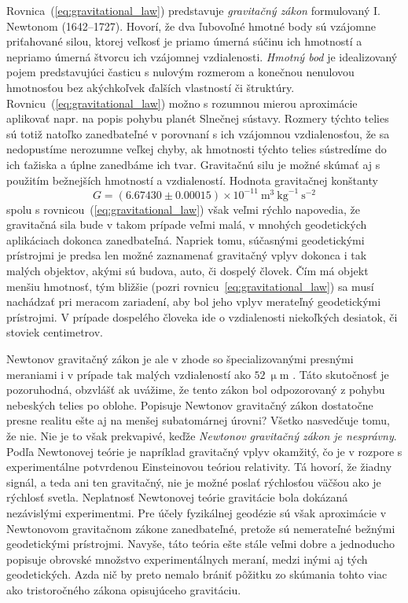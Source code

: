 \documentclass[a4paper, 12pt]{book}
\begin{document}
Rovnica~(\ref{eq:gravitational_law}) predstavuje \emph{gravitačný zákon} formulovaný 
I. Newtonom (1642--1727).  Hovorí, že dva ľubovoľné hmotné body sú vzájomne 
priťahované silou, ktorej veľkosť je priamo úmerná súčinu ich hmotností 
a nepriamo úmerná štvorcu ich vzájomnej vzdialenosti.  \emph{Hmotný bod} je 
idealizovaný pojem predstavujúci časticu s nulovým rozmerom a konečnou 
nenulovou hmotnosťou bez akýchkoľvek ďalších vlastností či štruktúry.  
Rovnicu~(\ref{eq:gravitational_law}) možno s rozumnou mierou aproximácie aplikovať 
napr. na popis pohybu planét Slnečnej sústavy.  Rozmery týchto telies sú totiž 
natoľko zanedbateľné v porovnaní s ich vzájomnou vzdialenosťou, že sa 
nedopustíme nerozumne veľkej chyby, ak hmotnosti týchto telies sústredíme do 
ich ťažiska a úplne zanedbáme ich tvar.  Gravitačnú silu je možné skúmať aj 
s použitím bežnejších hmotností a vzdialeností.  Hodnota gravitačnej konštanty
%
\begin{equation}
G = (6.67430 \pm 0.00015) \times 10^{-11} \ \mathrm{m}^3 \ \mathrm{kg}^{-1} 
\ \mathrm{s}^{-2}
\end{equation}
%
spolu s rovnicou~(\ref{eq:gravitational_law}) však veľmi rýchlo napovedia, že 
gravitačná sila bude v takom prípade veľmi malá, v mnohých geodetických 
aplikáciach dokonca zanedbateľná.  Napriek tomu, súčasnými geodetickými 
prístrojmi je predsa len možné zaznamenať gravitačný vplyv dokonca i tak malých 
objektov, akými sú budova, auto, či dospelý človek.  Čím má objekt menšiu 
hmotnosť, tým bližšie (pozri rovnicu~\ref{eq:gravitational_law}) sa musí nachádzať 
pri meracom zariadení, aby bol jeho vplyv merateľný geodetickými prístrojmi.  
V prípade dospelého človeka ide o vzdialenosti niekoľkých desiatok, či stoviek 
centimetrov.

Newtonov gravitačný zákon je ale v zhode so špecializovanými presnými meraniami 
i v prípade tak malých vzdialeností ako $52\ \upmu\mathrm{m}$ \citep{Lee2020}.  
Táto skutočnosť je pozoruhodná, obzvlášť ak uvážime, že tento zákon bol 
odpozorovaný z pohybu nebeských telies po oblohe.  Popisuje Newtonov gravitačný 
zákon dostatočne presne realitu ešte aj na menšej subatomárnej úrovni?  Všetko 
nasvedčuje tomu, že nie.  Nie je to však prekvapivé, keďže \emph{Newtonov 
gravitačný zákon je nesprávny}.  Podľa Newtonovej teórie je napríklad 
gravitačný vplyv okamžitý, čo je v rozpore s experimentálne potvrdenou 
Einsteinovou teóriou relativity.  Tá hovorí, že žiadny signál, a teda ani ten 
gravitačný, nie je možné poslať rýchlosťou väčšou ako je rýchlosť svetla.  
Neplatnosť Newtonovej teórie gravitácie bola dokázaná nezávislými experimentmi.  
Pre účely fyzikálnej geodézie sú však aproximácie v Newtonovom gravitačnom 
zákone zanedbateľné, pretože sú nemerateľné bežnými geodetickými prístrojmi.  
Navyše, táto teória ešte stále veľmi dobre a jednoducho popisuje obrovské 
množstvo experimentálnych meraní, medzi inými aj tých geodetických.  Azda nič 
by preto nemalo brániť pôžitku zo skúmania tohto viac ako tristoročného zákona 
opisujúceho gravitáciu.
\end{document}
